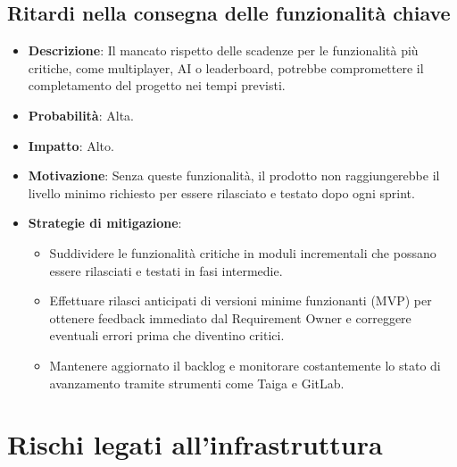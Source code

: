 \documentclass[12pt,a4paper]{report}
\begin{document}
\subsection{Ritardi nella consegna delle funzionalità chiave}
\begin{itemize}
    \item \textbf{Descrizione}: Il mancato rispetto delle scadenze per le funzionalità più critiche, come multiplayer, AI o leaderboard, potrebbe compromettere il completamento del progetto nei tempi previsti.
    \item \textbf{Probabilità}: Alta.
    \item \textbf{Impatto}: Alto.
    \item \textbf{Motivazione}: Senza queste funzionalità, il prodotto non raggiungerebbe il livello minimo richiesto per essere rilasciato e testato dopo ogni sprint.
    \item \textbf{Strategie di mitigazione}:
    \begin{itemize}
        \item Suddividere le funzionalità critiche in moduli incrementali che possano essere rilasciati e testati in fasi intermedie.
        \item Effettuare rilasci anticipati di versioni minime funzionanti (MVP) per ottenere feedback immediato dal Requirement Owner e correggere eventuali errori prima che diventino critici.
        \item Mantenere aggiornato il backlog e monitorare costantemente lo stato di avanzamento tramite strumenti come Taiga e GitLab.
    \end{itemize}
\end{itemize}

\section{Rischi legati all’infrastruttura}
\end{document}
